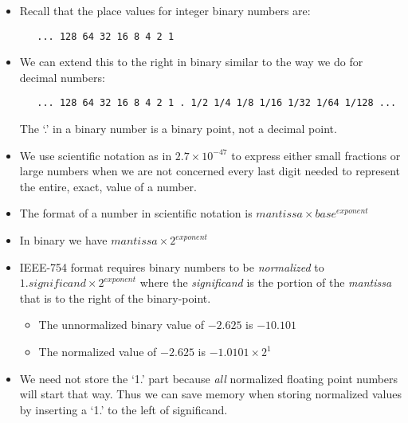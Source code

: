 \begin{itemize}
\item Recall that the place values for integer binary numbers are:
\begin{verbatim}
   ... 128 64 32 16 8 4 2 1
\end{verbatim}
\item We can extend this to the right in binary similar to the way we do for 
decimal numbers:
\begin{verbatim}
   ... 128 64 32 16 8 4 2 1 . 1/2 1/4 1/8 1/16 1/32 1/64 1/128 ...
\end{verbatim}
The `.' in a binary number is a binary point, not a decimal point.

\item We use scientific notation as in $2.7 \times 10^{-47}$ to express either 
small fractions or large numbers when we are not concerned every last digit 
needed to represent the entire, exact, value of a number.

\item The format of a number in scientific notation is $mantissa \times base^{exponent}$

\item In binary we have $mantissa \times 2^{exponent}$

\item IEEE-754 format requires binary numbers to be {\em normalized} to 
$1.significand \times 2^{exponent}$ where the {\em significand}
is the portion of the {\em mantissa} that is to the right of the binary-point.

\begin{itemize}
\item The unnormalized binary value of $-2.625$ is $-10.101$
\item The normalized value of $-2.625$ is $-1.0101 \times 2^1$
\end{itemize}

\item We need not store the `1.' part because {\em all} normalized floating 
point numbers will start that way.  Thus we can save memory when storing
normalized values by inserting a `1.' to the left of significand.






\end{itemize}
